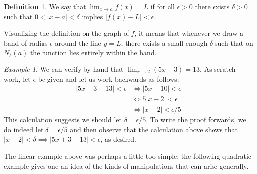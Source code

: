 \documentclass[11pt,oneside]{amsbook}
\theoremstyle{definition}
\theoremstyle{plain}
\theoremstyle{definition}
\newtheorem{definition}[theorem]{Definition}
\theoremstyle{remark}
\newtheorem{example}[theorem]{Example}
\numberwithin{equation}{section}
\numberwithin{figure}{section}
\begin{document}
\begin{definition}
  We say that $\lim_{x\to a}f(x)=L$ if for all $\epsilon>0$ there exists $\delta>0$ such that $0<|x-a|<\delta$ implies $|f(x)-L|<\epsilon$.
\end{definition}

Visualizing the definition on the graph of $f$, it means that whenever we draw a band of radius $\epsilon$ around the line $y=L$, there exists a small enough $\delta$ such that on $N_\delta(a)$ the function lies entirely within the band.
\begin{center}
\end{center}

\begin{example}
  We can verify by hand that $\lim_{x\to2}(5x+3)=13$. As scratch work, let $\epsilon$ be given and let us work backwards as follows:
  \begin{align*}
    |5x+3-13|<\epsilon&\iff|5x-10|<\epsilon\\
                      &\iff5|x-2|<\epsilon\\
                      &\iff|x-2|<\epsilon/5
  \end{align*}
  This calculation suggests we should let $\delta=\epsilon/5$. To write the proof forwards, we do indeed let $\delta=\epsilon/5$ and then observe that the calculation above shows that $|x-2|<\delta\implies|5x+3-13|<\epsilon$, as desired.
\end{example}

The linear example above was perhaps a little too simple; the following quadratic example gives one an idea of the kinds of manipulations that can arise generally.
\end{document}
